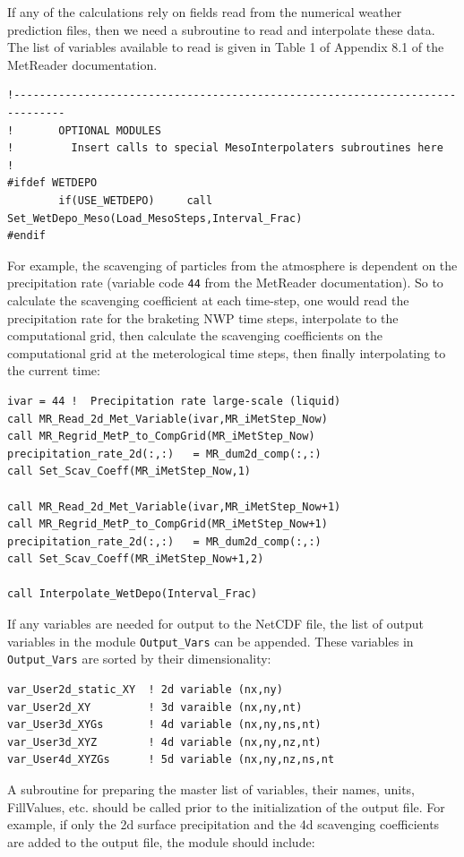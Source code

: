 If any of the calculations rely on fields read from the numerical weather
prediction files, then we need a subroutine to read and interpolate these
data.  The list of variables available to read is given in Table 1 of Appendix 8.1
of the MetReader documentation.
\small
\begin{verbatim}
!------------------------------------------------------------------------------
!       OPTIONAL MODULES
!         Insert calls to special MesoInterpolaters subroutines here
!
#ifdef WETDEPO
        if(USE_WETDEPO)     call Set_WetDepo_Meso(Load_MesoSteps,Interval_Frac)
#endif
\end{verbatim}
\normalsize
For example, the scavenging of particles from the atmosphere is dependent on
the precipitation rate (variable code \texttt{44} from the MetReader documentation).
So to calculate the scavenging coefficient at each time-step, one would read the
precipitation rate for the braketing NWP time steps, interpolate to the computational
grid, then calculate the scavenging coefficients on the computational grid at the
meterological time steps, then finally interpolating to the current time:
\small
\begin{verbatim}
ivar = 44 !  Precipitation rate large-scale (liquid)
call MR_Read_2d_Met_Variable(ivar,MR_iMetStep_Now)
call MR_Regrid_MetP_to_CompGrid(MR_iMetStep_Now)
precipitation_rate_2d(:,:)   = MR_dum2d_comp(:,:)
call Set_Scav_Coeff(MR_iMetStep_Now,1)

call MR_Read_2d_Met_Variable(ivar,MR_iMetStep_Now+1)
call MR_Regrid_MetP_to_CompGrid(MR_iMetStep_Now+1)
precipitation_rate_2d(:,:)   = MR_dum2d_comp(:,:)
call Set_Scav_Coeff(MR_iMetStep_Now+1,2)

call Interpolate_WetDepo(Interval_Frac)
\end{verbatim}
\normalsize
If any variables are needed for output to the NetCDF file, the list of output
variables in the module \texttt{Output\_Vars} can be appended.  These variables
in \texttt{Output\_Vars} are sorted by their dimensionality:
\small
\begin{verbatim}
var_User2d_static_XY  ! 2d variable (nx,ny)
var_User2d_XY         ! 3d varaible (nx,ny,nt)
var_User3d_XYGs       ! 4d variable (nx,ny,ns,nt)
var_User3d_XYZ        ! 4d variable (nx,ny,nz,nt)
var_User4d_XYZGs      ! 5d variable (nx,ny,nz,ns,nt
\end{verbatim}
\normalsize
A subroutine for preparing the master list of variables, their names, units,
FillValues, etc. should be called prior to the initialization of the output file.
For example, if only the 2d surface precipitation and the 4d scavenging coefficients
are added to the output file, the module should include:


